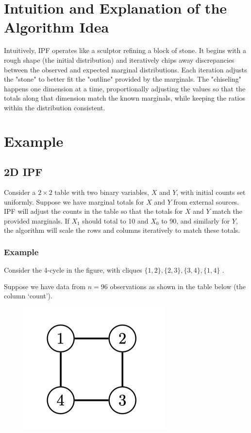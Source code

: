 \documentclass{article}
\begin{document}
\section{Intuition and Explanation of the Algorithm Idea}

Intuitively, IPF operates like a sculptor refining a block of stone. It begins with a rough shape (the initial distribution) and iteratively chips away discrepancies between the observed and expected marginal distributions. Each iteration adjusts the "stone" to better fit the "outline" provided by the marginals. The "chiseling" happens one dimension at a time, proportionally adjusting the values so that the totals along that dimension match the known marginals, while keeping the ratios within the distribution consistent.

\section{Example}

\subsection{2D IPF}

Consider a \(2 \times 2\) table with two binary variables, \(X\) and \(Y\), with initial counts set uniformly. Suppose we have marginal totals for \(X\) and \(Y\) from external sources. IPF will adjust the counts in the table so that the totals for \(X\) and \(Y\) match the provided marginals. If \(X_1\) should total to 10 and \(X_0\) to 90, and similarly for \(Y\), the algorithm will scale the rows and columns iteratively to match these totals.


\subsubsection{Example}
Consider the 4-cycle in the figure, with cliques $\{1, 2 \} , \{ 2, 3 \} , \{ 3, 4 \} , \{ 1, 4 \}$ .

Suppose we have data from $n = 96$ observations as shown in the table below (the column ‘count’).


\begin{figure}
    \centering
    \includegraphics[width=0.5\linewidth]{overviews/graphical-models/figures/Graph.png}
\end{figure}
\end{document}
